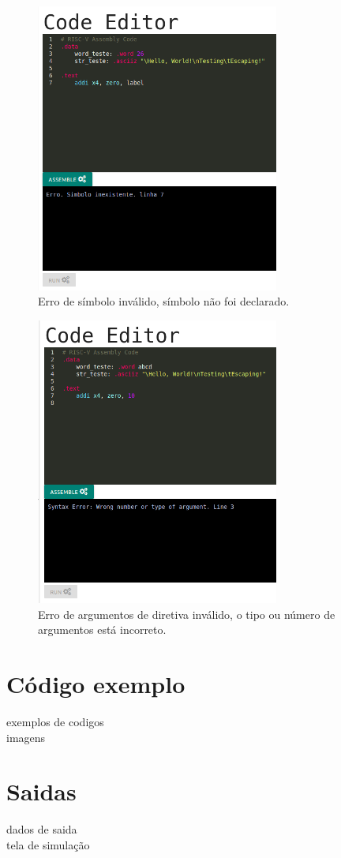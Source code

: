 	\begin{figure}[h]
	  \centering
	  \includegraphics[width=8cm]{img/assemble_error_simbolo_inexistente.png}
	  \caption{Erro de símbolo inválido, símbolo não foi declarado.}
	  \label{fig:assemble_error_simbolo_inexistente}
	\end{figure}

	\begin{figure}[h]
	  \centering
	  \includegraphics[width=8cm]{img/assemble_error_wrong_arguments.png}
	  \caption{Erro de argumentos de diretiva inválido, o tipo ou número de argumentos está incorreto.}
	  \label{fig:assemble_error_wrong_arguments}
	\end{figure}





\section{Código exemplo}
	exemplos de codigos\\
	imagens\\

\section{Saidas}
	dados de saida\\
	tela de simulação


